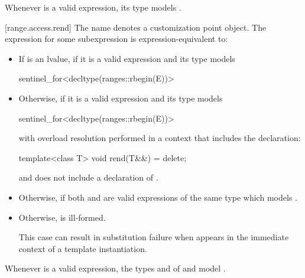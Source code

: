 \pnum
\begin{note}
Whenever  is a valid expression, its type models
.
\end{note}

[range.access.rend]{}
\pnum
The name  denotes a customization point
object. The expression
 for some subexpression  is
expression-equivalent to:
\begin{itemize}
\item
  If  is an lvalue, 
  if it is a valid expression and its type  models
  \begin{codeblock}
sentinel_for<decltype(ranges::rbegin(E))>
  \end{codeblock}

\item
  Otherwise,  if it is a valid
  expression and its type  models
  \begin{codeblock}
sentinel_for<decltype(ranges::rbegin(E))>
  \end{codeblock}
  with overload
  resolution performed in a context that includes the declaration:
  \begin{codeblock}
template<class T> void rend(T&&) = delete;
  \end{codeblock}
  and does not include a declaration of .

\item
  Otherwise,  if both
   and  are valid
  expressions of the same type  which models
  .

\item
  Otherwise,  is ill-formed.
  \begin{note}
  This case can result in substitution failure when 
  appears in the immediate context of a template instantiation.
  \end{note}
\end{itemize}

\pnum
\begin{note}
Whenever  is a valid expression,
the types  and  of
 and 
model .
\end{note}

